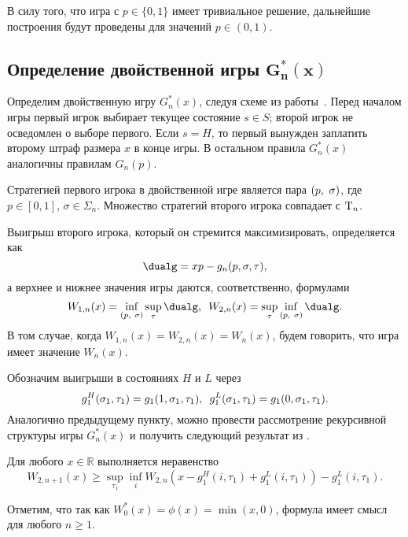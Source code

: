 {В силу того, что игра с $p \in \{0, 1\}$ имеет тривиальное решение, дальнейшие построения будут проведены для значений $p \in (0, 1)$.

\subsection{Определение двойственной игры $\mathbf{G^*_n(x)}$}
Определим двойственную игру $G^*_n(x)$, следуя схеме из работы~\cite{demeyer02}.
Перед началом игры первый игрок выбирает текущее состояние $s \in S$; второй игрок не осведомлен о выборе первого.
Если $s = H$, то первый вынужден заплатить второму штраф размера $x$ в конце игры.
В остальном правила $G^*_n(x)$ аналогичны правилам $G_n(p)$.

Стратегией первого игрока в двойственной игре является пара $(p,\ \sigma)$, где $p \in [0, 1]$, $\sigma \in \Sigma_n$.
Множество стратегий второго игрока совпадает с $\mathrm{T}_n$.

Выигрыш второго игрока, который он стремится максимизировать, определяется как
\begin{equation*}
  \dualg = x p - g_n(p, \sigma, \tau),
\end{equation*}
а верхнее и нижнее значения игры даются, соответственно, формулами
\begin{equation*}
  W_{1,n}(x) = \inf_{\dualFPS} \sup_\tau \dualg, \enskip
  W_{2,n}(x) = \sup_\tau \inf_{\dualFPS} \dualg.
\end{equation*}
В том случае, когда $W_{1,n}(x) = W_{2,n}(x) = W_n(x)$, будем говорить, что игра имеет значение $W_n(x)$.

Обозначим выигрыши в состояниях $H$ и $L$ через
\begin{equation*}
 g^H_1(\sigma_1, \tau_1) = g_1(1, \sigma_1, \tau_1), \enskip g^L_1(\sigma_1, \tau_1) = g_1(0, \sigma_1, \tau_1).
\end{equation*}
Аналогично предыдущему пункту, можно провести рассмотрение рекурсивной структуры игры $G^*_n(x)$ и получить следующий результат из \cite{demeyer02}.
\begin{lemma}\label{ch2:lem:low-bound-dual:general}
  Для любого $x \in \mathbb{R}$ выполняется неравенство
  \begin{equation}\label{ch2:eq:low-bound-dual:general}
    W_{2,n+1}(x) \geqslant \sup_{\tau_1} \inf_{i}
    W_{2,n}(x - g^H_1(i, \tau_1) + g_1^L(i, \tau_1)) - g^L_1(i, \tau_1).
  \end{equation}
\end{lemma}
Отметим, что так как $W^*_0(x) = \phi(x) = \min(x, 0)$, формула имеет смысл для любого $n \geqslant 1$.

}
